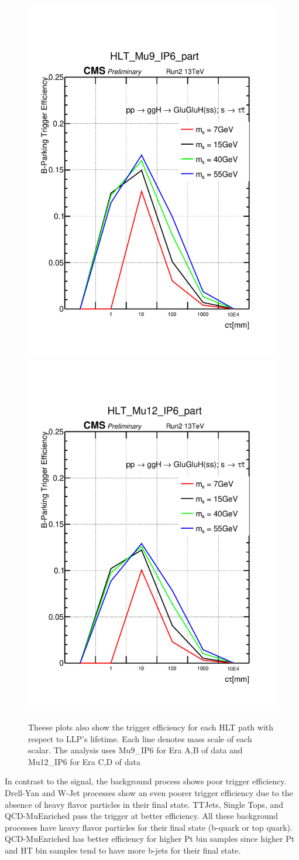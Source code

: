 \begin{figure}[h!]
\caption{Theese plots also show the trigger efficiency for each HLT path with respect to LLP's lifetime. Each line denotes mass scale of each scalar. The analysis uses Mu9\_IP6 for Era A,B of data and Mu12\_IP6 for Era C,D of data}
  \centering
  \includegraphics[width=0.47\linewidth]{figs/TrigEff_HLT_Mu9_IP6_part.pdf}
  \includegraphics[width=0.47\linewidth]{figs/TrigEff_HLT_Mu12_IP6_part.pdf}

\end{figure}

In contrast to the signal, the background process shows poor trigger efficiency.
Drell-Yan and W-Jet processes show an even poorer trigger efficiency due to the absence of heavy flavor particles in their final state.
TTJets, Single Tops, and QCD-MuEnriched pass the trigger at better efficiency.
All these background processes have heavy flavor particles for their final state (b-quark or top quark).
QCD-MuEnriched has better efficiency for higher Pt bin samples since higher Pt and HT bin samples tend to have more b-jets for their final state.


